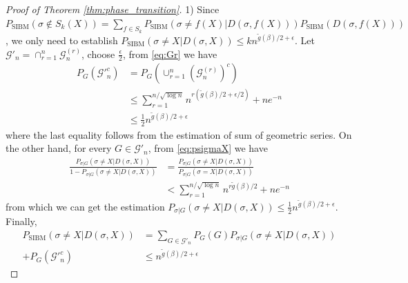 \documentclass[journal]{IEEEtran}
\newcommand{\cG}{\mathcal{G}}
\newcommand{\1}{\mathbbm{1}}
\DeclareMathOperator{\SIBM}{SIBM}
\begin{document}
\begin{proof}[Proof of Theorem \ref{thm:phase_transition}]
	1) Since $P_{\SIBM}(\sigma \not \in S_k(X)) = \sum_{f\in S_k} P_{\SIBM}(\sigma \neq f(X) | D(\sigma, f(X))) P_{\SIBM}(D(\sigma, f(X)))$,
	we only need to establish $P_{\SIBM}(\sigma \neq X | D(\sigma, X)) \leq k n^{\tilde{g}(\beta)/2 + \epsilon}$.
	Let $\cG'_n = \cap_{r=1}^n \cG_n^{(r)}$, choose $\frac{\epsilon}{2}$, from \eqref{eq:Gr} we have
	\begin{align*}
	P_G(\cG'^c_n) &= P_G(\cup_{r=1}^n (\cG_n^{(r)})^c) \\
	&\leq \sum_{r=1}^{n/\sqrt{\log n } } n^{r(\tilde{g}(\beta)/2 + \epsilon/2)}  + n e^{-n} \\
	& \leq \frac{1}{2} n^{\tilde{g}(\beta)/2 + \epsilon}
	\end{align*}
	where the last equality follows from the estimation of sum of geometric series.
	On the other hand, for every $G \in \cG'_n$, from \eqref{eq:psigmaX}
	we have
	\begin{align*}
	\frac{P_{\sigma | G}(\sigma \neq X | D(\sigma, X))}{1-P_{\sigma | G}(\sigma \neq X | D(\sigma, X))} &= \frac{P_{\sigma | G}(\sigma \neq X | D(\sigma, X))}{P_{\sigma|G}(\sigma=X | D(\sigma, X))} \\
	&< \sum_{r=1}^{n/\sqrt{\log n }}  n^{r\tilde{g}(\beta)/2} + n e^{-n}
	\end{align*}
	from which we can get the estimation $P_{\sigma | G}(\sigma \neq X | D(\sigma, X))\leq \frac{1}{2}n^{\tilde{g}(\beta)/2 + \epsilon}$.
	Finally, 
	\begin{align*}
	P_{\SIBM}(\sigma \neq X|D(\sigma, X)) &= \sum_{G\in \cG'_n} P_G(G)P_{\sigma |G}(\sigma \neq X | D(\sigma, X)) \\
	+ P_G(\cG'^c_n)
	& \leq n^{\tilde{g}(\beta)/2 + \epsilon}
	\end{align*}
	

\end{proof}
\end{document}
